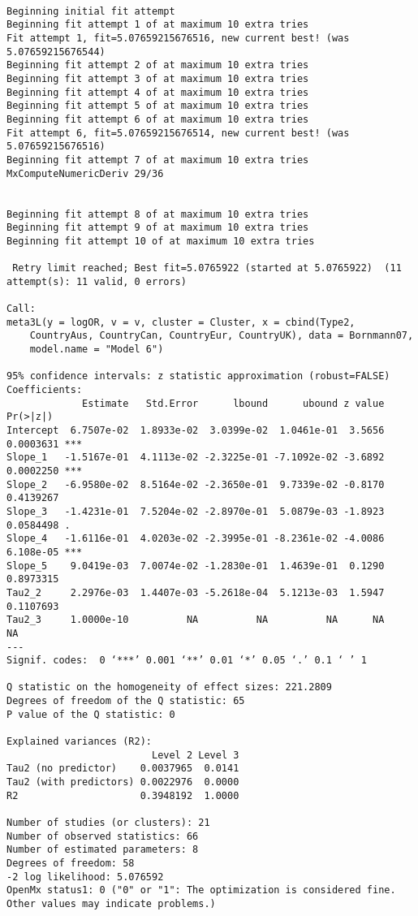 \documentclass[11pt]{article}
\begin{document}
\begin{verbatim}

Beginning initial fit attempt
Beginning fit attempt 1 of at maximum 10 extra tries
Fit attempt 1, fit=5.07659215676516, new current best! (was 5.07659215676544)
Beginning fit attempt 2 of at maximum 10 extra tries                         
Beginning fit attempt 3 of at maximum 10 extra tries
Beginning fit attempt 4 of at maximum 10 extra tries
Beginning fit attempt 5 of at maximum 10 extra tries
Beginning fit attempt 6 of at maximum 10 extra tries
Fit attempt 6, fit=5.07659215676514, new current best! (was 5.07659215676516)
Beginning fit attempt 7 of at maximum 10 extra tries                         
MxComputeNumericDeriv 29/36
                           

Beginning fit attempt 8 of at maximum 10 extra tries
Beginning fit attempt 9 of at maximum 10 extra tries
Beginning fit attempt 10 of at maximum 10 extra tries
                                                     
 Retry limit reached; Best fit=5.0765922 (started at 5.0765922)  (11 attempt(s): 11 valid, 0 errors)

Call:
meta3L(y = logOR, v = v, cluster = Cluster, x = cbind(Type2, 
    CountryAus, CountryCan, CountryEur, CountryUK), data = Bornmann07, 
    model.name = "Model 6")

95% confidence intervals: z statistic approximation (robust=FALSE)
Coefficients:
             Estimate   Std.Error      lbound      ubound z value  Pr(>|z|)    
Intercept  6.7507e-02  1.8933e-02  3.0399e-02  1.0461e-01  3.5656 0.0003631 ***
Slope_1   -1.5167e-01  4.1113e-02 -2.3225e-01 -7.1092e-02 -3.6892 0.0002250 ***
Slope_2   -6.9580e-02  8.5164e-02 -2.3650e-01  9.7339e-02 -0.8170 0.4139267    
Slope_3   -1.4231e-01  7.5204e-02 -2.8970e-01  5.0879e-03 -1.8923 0.0584498 .  
Slope_4   -1.6116e-01  4.0203e-02 -2.3995e-01 -8.2361e-02 -4.0086 6.108e-05 ***
Slope_5    9.0419e-03  7.0074e-02 -1.2830e-01  1.4639e-01  0.1290 0.8973315    
Tau2_2     2.2976e-03  1.4407e-03 -5.2618e-04  5.1213e-03  1.5947 0.1107693    
Tau2_3     1.0000e-10          NA          NA          NA      NA        NA    
---
Signif. codes:  0 ‘***’ 0.001 ‘**’ 0.01 ‘*’ 0.05 ‘.’ 0.1 ‘ ’ 1

Q statistic on the homogeneity of effect sizes: 221.2809
Degrees of freedom of the Q statistic: 65
P value of the Q statistic: 0

Explained variances (R2):
                         Level 2 Level 3
Tau2 (no predictor)    0.0037965  0.0141
Tau2 (with predictors) 0.0022976  0.0000
R2                     0.3948192  1.0000

Number of studies (or clusters): 21
Number of observed statistics: 66
Number of estimated parameters: 8
Degrees of freedom: 58
-2 log likelihood: 5.076592 
OpenMx status1: 0 ("0" or "1": The optimization is considered fine.
Other values may indicate problems.)
\end{verbatim}
\end{document}
